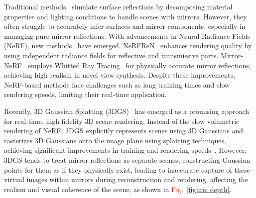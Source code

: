 \documentclass[conference]{IEEEtran}
\begin{document}

Traditional methods~\cite{srinivasan2021nerv, verbin2022ref, zhang2022modeling, shi2023gir, ma2023specnerf} simulate surface reflections by decomposing material properties and lighting conditions to handle scenes with mirrors. However, they often struggle to accurately infer surfaces and mirror components, especially in managing pure mirror reflections. With advancements in Neural Radiance Fields (NeRF), new methods~\cite{verbin2022ref, guo2022nerfren, zeng2023mirror} have emerged. NeRFReN~\cite{guo2022nerfren} enhances rendering quality by using independent radiance fields for reflective and transmissive parts. Mirror-NeRF~\cite{zeng2023mirror} employs Whitted Ray Tracing~\cite{whitted2005improved} for physically accurate mirror reflections, achieving high realism in novel view synthesis. Despite these improvements, NeRF-based methods face challenges such as long training times and slow rendering speeds, limiting their real-time application.
%


Recently, 3D Gaussian Splatting (3DGS)~\cite{3dgs} has emerged as a promising approach for real-time, high-fidelity 3D scene rendering. Instead of the slow volumetric rendering of NeRF, 3DGS explicitly represents scenes using 3D Gaussians and rasterizes 3D Gaussians onto the image plane using splatting techniques, achieving significant improvements in training and rendering speeds~\cite{yang2024fourier123}. However, 3DGS tends to treat mirror reflections as separate scenes, constructing Gaussian points for them as if they physically exist, 
leading to inaccurate capture of these virtual images within mirrors during reconstruction and rendering, affecting the realism and visual coherence of the scene, as shown in  \textcolor{red}{Fig.~\ref{figure: depth}}.
\end{document}
